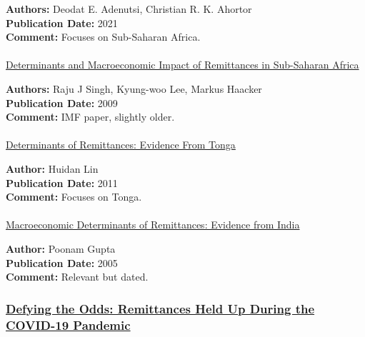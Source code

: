 \documentclass[
  11pt,
]{article}
\makeatletter
\let\oldparagraph\paragraph
\renewcommand{\paragraph}{
    \@ifstar
      \xxxParagraphStar
      \xxxParagraphNoStar
  }
\newcommand{\xxxParagraphStar}[1]{\oldparagraph*{#1}\mbox{}}
\newcommand{\xxxParagraphNoStar}[1]{\oldparagraph{#1}\mbox{}}
\makeatother
\begin{document}
\textbf{Authors:} Deodat E. Adenutsi, Christian R. K. Ahortor\\
\textbf{Publication Date:} 2021\\
\textbf{Comment:} Focuses on Sub-Saharan Africa.

\paragraph{\texorpdfstring{\href{https://www.elibrary.imf.org/view/journals/001/2009/216/article-A001-en.xml}{Determinants
and Macroeconomic Impact of Remittances in Sub-Saharan
Africa}}{Determinants and Macroeconomic Impact of Remittances in Sub-Saharan Africa}}\label{determinants-and-macroeconomic-impact-of-remittances-in-sub-saharan-africa}

\textbf{Authors:} Raju J Singh, Kyung-woo Lee, Markus Haacker\\
\textbf{Publication Date:} 2009\\
\textbf{Comment:} IMF paper, slightly older.

\paragraph{\texorpdfstring{\href{https://www.elibrary.imf.org/view/journals/001/2011/018/article-A001-en.xml?ArticleTabs=Related\%20Documents}{Determinants
of Remittances: Evidence From
Tonga}}{Determinants of Remittances: Evidence From Tonga}}\label{determinants-of-remittances-evidence-from-tonga}

\textbf{Author:} Huidan Lin\\
\textbf{Publication Date:} 2011\\
\textbf{Comment:} Focuses on Tonga.

\paragraph{\texorpdfstring{\href{https://www.imf.org/en/Publications/WP/Issues/2016/12/31/Macroeconomic-Determinants-of-Remittances-Evidence-from-India-18728}{Macroeconomic
Determinants of Remittances: Evidence from
India}}{Macroeconomic Determinants of Remittances: Evidence from India}}\label{macroeconomic-determinants-of-remittances-evidence-from-india}

\textbf{Author:} Poonam Gupta\\
\textbf{Publication Date:} 2005\\
\textbf{Comment:} Relevant but dated.

\subsubsection{\texorpdfstring{\href{https://cepr.org/voxeu/columns/defying-odds-remittances-held-during-covid-19-pandemic}{Defying
the Odds: Remittances Held Up During the COVID-19
Pandemic}}{Defying the Odds: Remittances Held Up During the COVID-19 Pandemic}}\label{defying-the-odds-remittances-held-up-during-the-covid-19-pandemic}
\end{document}
